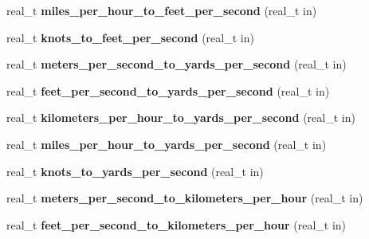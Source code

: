 \begin{DoxyCompactItemize}
\item 
\hypertarget{namespaceetk_a2ed30f738af5f663fd3b39b14605a980}{real\-\_\-t {\bfseries miles\-\_\-per\-\_\-hour\-\_\-to\-\_\-feet\-\_\-per\-\_\-second} (real\-\_\-t in)}\label{namespaceetk_a2ed30f738af5f663fd3b39b14605a980}

\item 
\hypertarget{namespaceetk_aea9eb556072d4a75ae08536ba8879689}{real\-\_\-t {\bfseries knots\-\_\-to\-\_\-feet\-\_\-per\-\_\-second} (real\-\_\-t in)}\label{namespaceetk_aea9eb556072d4a75ae08536ba8879689}

\item 
\hypertarget{namespaceetk_a31feadbed4d05ff5fcf271fc08efdb99}{real\-\_\-t {\bfseries meters\-\_\-per\-\_\-second\-\_\-to\-\_\-yards\-\_\-per\-\_\-second} (real\-\_\-t in)}\label{namespaceetk_a31feadbed4d05ff5fcf271fc08efdb99}

\item 
\hypertarget{namespaceetk_a5a8941319f5359a4c6894733a0c890ef}{real\-\_\-t {\bfseries feet\-\_\-per\-\_\-second\-\_\-to\-\_\-yards\-\_\-per\-\_\-second} (real\-\_\-t in)}\label{namespaceetk_a5a8941319f5359a4c6894733a0c890ef}

\item 
\hypertarget{namespaceetk_ac5915afaf40bfb6e0c02cf1764383334}{real\-\_\-t {\bfseries kilometers\-\_\-per\-\_\-hour\-\_\-to\-\_\-yards\-\_\-per\-\_\-second} (real\-\_\-t in)}\label{namespaceetk_ac5915afaf40bfb6e0c02cf1764383334}

\item 
\hypertarget{namespaceetk_a86a907635ec955b203971763872312a1}{real\-\_\-t {\bfseries miles\-\_\-per\-\_\-hour\-\_\-to\-\_\-yards\-\_\-per\-\_\-second} (real\-\_\-t in)}\label{namespaceetk_a86a907635ec955b203971763872312a1}

\item 
\hypertarget{namespaceetk_a544ae62be69f2a6595957d3a095bc2b3}{real\-\_\-t {\bfseries knots\-\_\-to\-\_\-yards\-\_\-per\-\_\-second} (real\-\_\-t in)}\label{namespaceetk_a544ae62be69f2a6595957d3a095bc2b3}

\item 
\hypertarget{namespaceetk_a42ea95a4cd47517eaeb0d9a5229cf5fe}{real\-\_\-t {\bfseries meters\-\_\-per\-\_\-second\-\_\-to\-\_\-kilometers\-\_\-per\-\_\-hour} (real\-\_\-t in)}\label{namespaceetk_a42ea95a4cd47517eaeb0d9a5229cf5fe}

\item 
\hypertarget{namespaceetk_ae59831a9a73bfbbdcdb7e2f4e9a3d418}{real\-\_\-t {\bfseries feet\-\_\-per\-\_\-second\-\_\-to\-\_\-kilometers\-\_\-per\-\_\-hour} (real\-\_\-t in)}\label{namespaceetk_ae59831a9a73bfbbdcdb7e2f4e9a3d418}


\end{DoxyCompactItemize}
